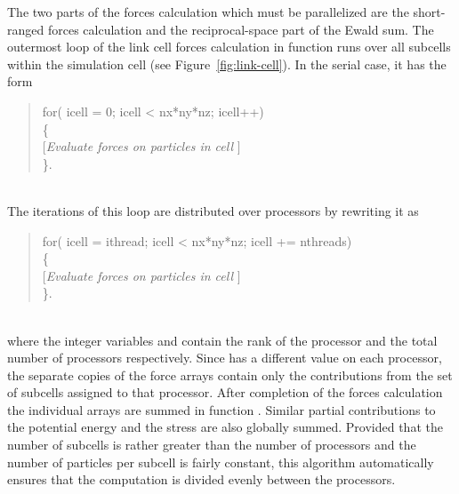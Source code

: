 \documentclass[a4paper,twoside]{report}
\begin{document}
The two parts of the forces calculation which must be parallelized are
the short-ranged forces calculation and the reciprocal-space part of
the Ewald sum.  The outermost loop of the link cell forces calculation
in function  runs over all subcells within the
simulation cell (see Figure~\ref{fig:link-cell}).  In the serial case, 
it has the form\\
\parbox{\textwidth}{%
\begin{quote}
  \Litf
  for( icell = 0; icell < nx*ny*nz; icell++)\\
  \{\\
  \hspace*{1cm}\textnormal{[\emph{Evaluate forces on particles in cell}
  ]}\\ 
    \}.
\end{quote}}\\
The iterations of this loop are distributed over processors by
rewriting it as\\
\parbox{\textwidth}{%
\begin{quote}
  \Litf
  for( icell = ithread; icell < nx*ny*nz; icell += nthreads)\\
  \{\\
  \hspace*{1cm}\textnormal{[\emph{Evaluate forces on particles in cell}
  ]}\\ 
    \}.
\end{quote}}\\
where the integer variables  and  contain
the rank of the processor and the total number of processors
respectively. Since  has a different value on each
processor, the separate copies of the force arrays contain only the
contributions from the set of subcells assigned to that processor.
After completion of the forces calculation the individual arrays are
summed in function .  Similar partial contributions to
the potential energy and the stress are also globally summed.
Provided that the number of subcells is rather greater than the number
of processors and the number of particles per subcell is fairly
constant, this algorithm automatically ensures that the computation is
divided evenly between the processors.
\end{document}
